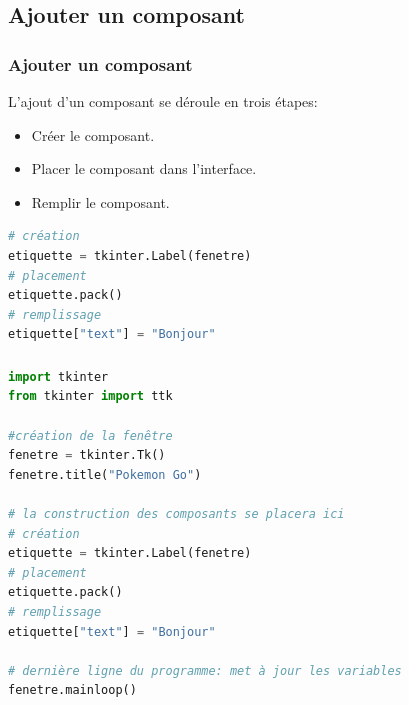 \documentclass[svgnames,11pt]{beamer}
\begin{document}
\subsection{Ajouter un composant}
\begin{frame}
    \frametitle{Ajouter un composant}

    L'ajout d'un composant se déroule en trois étapes:
    \begin{itemize}
        \item Créer le composant.
        \item Placer le composant dans l'interface.
        \item Remplir le composant.
    \end{itemize}

\end{frame}
\begin{frame}[fragile]

    \begin{center}
        \begin{lstlisting}[language=Python , basicstyle=\ttfamily\small, xleftmargin=1em, xrightmargin=1em]
# création
etiquette = tkinter.Label(fenetre)
# placement
etiquette.pack()
# remplissage
etiquette["text"] = "Bonjour"
\end{lstlisting}
        \label{label}
    \end{center}

\end{frame}
\begin{frame}[fragile]
    \frametitle{}

    \begin{center}
    \begin{lstlisting}[language=Python , basicstyle=\ttfamily\small, xleftmargin=1em, xrightmargin=1em]
import tkinter
from tkinter import ttk

#création de la fenêtre
fenetre = tkinter.Tk()
fenetre.title("Pokemon Go")

# la construction des composants se placera ici
# création
etiquette = tkinter.Label(fenetre)
# placement
etiquette.pack()
# remplissage
etiquette["text"] = "Bonjour"

# dernière ligne du programme: met à jour les variables 
fenetre.mainloop()
\end{lstlisting}
    \label{CODE}
    \end{center}

\end{frame}
\end{document}
